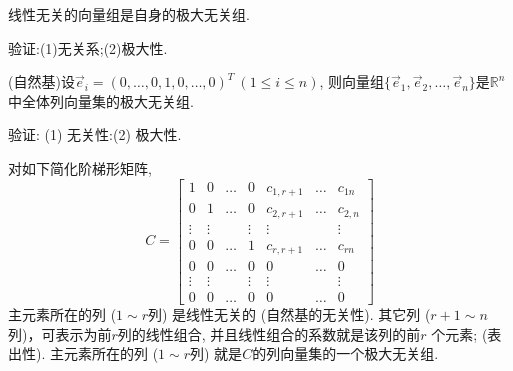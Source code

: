 \begin{eg}
线性无关的向量组是自身的极大无关组.

验证:(1)无关系;(2)极大性.
\end{eg}

\begin{eg}
(自然基)设$\vec{e}_i=(0,\dots,0,1,0,\dots,0)^T\ (1\leq i\leq n)$, 则向量组$\{\vec{e}_1,\vec{e}_2,\dots,\vec{e}_n\}$是$\mathbb{R}^n$中全体列向量集的极大无关组.

验证: (1) 无关性:(2) 极大性.
\end{eg}

\begin{eg}
对如下简化阶梯形矩阵,
\begin{displaymath}
C=\begin{bmatrix}1&0&\dots&0&c_{1,r+1}&\dots&c_{1n}\\0&1&\dots & 0&c_{2,r+1}&\dots&c_{2,n}\\ \vdots&\vdots&&\vdots&\vdots&&\vdots\\0&0&\dots&1&c_{r,r+1}&\dots&c_{rn}\\0& 0&\dots&0&0&\dots&0\\ \vdots&\vdots&&\vdots&\vdots&&\vdots \\0& 0&\dots&0&0&\dots&0\end{bmatrix}\end{displaymath}
主元素所在的列 ($1\sim r$列) 是线性无关的 (自然基的无关性). 其它列 ($r+1 \sim n$列)，可表示为前$r$列的线性组合,  并且线性组合的系数就是该列的前$r$ 个元素; (表出性). 主元素所在的列 ($1\sim r$列) 就是$C$的列向量集的一个极大无关组.
\end{eg}

